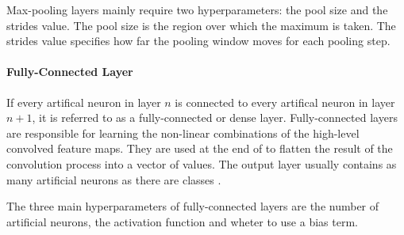 Max-pooling layers mainly require two hyperparameters: the pool size and the strides value.
The pool size is the region over which the maximum is taken.
The strides value specifies how far the pooling window moves for each pooling step.

\paragraph{Fully-Connected Layer}
If every artifical neuron in layer $n$ is connected to every artifical neuron in layer $n + 1$, it is referred to as a fully-connected or dense layer.
Fully-connected layers are responsible for learning the non-linear combinations of the high-level convolved feature maps.
They are used at the end of  to flatten the result of the convolution process into a vector of values.
The output layer usually contains as many artificial neurons as there are classes \cite{}. %

The three main hyperparameters of fully-connected layers are the number of artificial neurons, the activation function and wheter to use a bias term.





